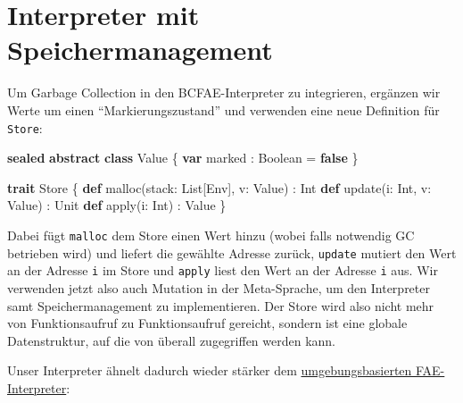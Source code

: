 \documentclass[]{article}
\newenvironment{Shaded}{}{}
\newcommand{\FunctionTok}[1]{\textcolor[rgb]{0.02,0.16,0.49}{#1}}
\newcommand{\KeywordTok}[1]{\textcolor[rgb]{0.00,0.44,0.13}{\textbf{#1}}}
\newcommand{\NormalTok}[1]{#1}
\begin{document}
\hypertarget{interpreter-mit-speichermanagement}{%
\section{Interpreter mit
Speichermanagement}\label{interpreter-mit-speichermanagement}}

Um Garbage Collection in den BCFAE-Interpreter zu integrieren, ergänzen
wir Werte um einen ``Markierungszustand'' und verwenden eine neue
Definition für \texttt{Store}:

\begin{Shaded}
\begin{Highlighting}[]
\KeywordTok{sealed} \KeywordTok{abstract} \KeywordTok{class}\NormalTok{ Value \{}
  \KeywordTok{var}\NormalTok{ marked : Boolean = }\KeywordTok{false}
\NormalTok{\}}

\KeywordTok{trait}\NormalTok{ Store \{}
  \KeywordTok{def} \FunctionTok{malloc}\NormalTok{(stack: List[Env], v: Value) : Int}
  \KeywordTok{def} \FunctionTok{update}\NormalTok{(i: Int, v: Value) : Unit}
  \KeywordTok{def} \FunctionTok{apply}\NormalTok{(i: Int) : Value}
\NormalTok{\}}
\end{Highlighting}
\end{Shaded}

Dabei fügt \texttt{malloc} dem Store einen Wert hinzu (wobei falls
notwendig GC betrieben wird) und liefert die gewählte Adresse zurück,
\texttt{update} mutiert den Wert an der Adresse \texttt{i} im Store und
\texttt{apply} liest den Wert an der Adresse \texttt{i} aus. Wir
verwenden jetzt also auch Mutation in der Meta-Sprache, um den
Interpreter samt Speichermanagement zu implementieren. Der Store wird
also nicht mehr von Funktionsaufruf zu Funktionsaufruf gereicht, sondern
ist eine globale Datenstruktur, auf die von überall zugegriffen werden
kann.

Unser Interpreter ähnelt dadurch wieder stärker dem
\protect\hyperlink{umgebungsbasierter-interpreter-a}{umgebungsbasierten
FAE-Interpreter}:
\end{document}
